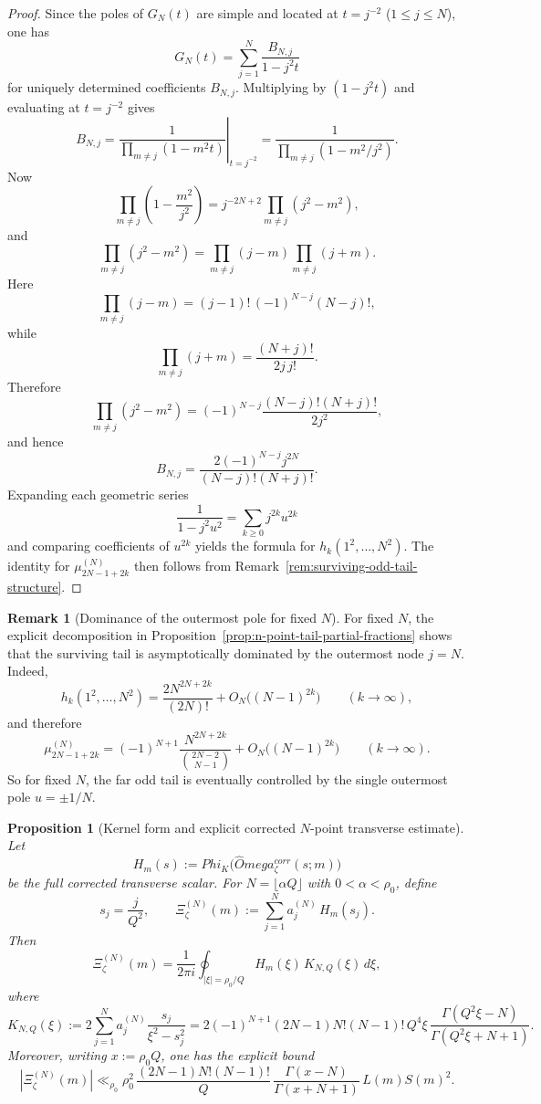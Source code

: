 \documentclass[11pt,a4paper]{amsart}
\def\Omega{Omega}%
\def\Phi{Phi}%
\def\corr{corr}%
\theoremstyle{plain}
\newtheorem{proposition}[theorem]{Proposition}
\theoremstyle{definition}
\newtheorem{remark}[theorem]{Remark}
\newcommand{\corr}{\mathrm{corr}}
\begin{document}
\begin{proof}
Since the poles of $G_N(t)$ are simple and located at $t=j^{-2}$
($1\le j\le N$), one has
\[
G_N(t)=\sum_{j=1}^N \frac{B_{N,j}}{1-j^2 t}
\]
for uniquely determined coefficients $B_{N,j}$. Multiplying by
$(1-j^2 t)$ and evaluating at $t=j^{-2}$ gives
\[
B_{N,j}
=
\left.
\frac{1}{\prod_{m\ne j}(1-m^2 t)}
\right|_{t=j^{-2}}
=
\frac{1}{\prod_{m\ne j}(1-m^2/j^2)}.
\]
Now
\[
\prod_{m\ne j}\left(1-\frac{m^2}{j^2}\right)
=
j^{-2N+2}\prod_{m\ne j}(j^2-m^2),
\]
and
\[
\prod_{m\ne j}(j^2-m^2)
=
\prod_{m\ne j}(j-m)\prod_{m\ne j}(j+m).
\]
Here
\[
\prod_{m\ne j}(j-m)
=
(j-1)! \,(-1)^{N-j}(N-j)!,
\]
while
\[
\prod_{m\ne j}(j+m)
=
\frac{(N+j)!}{2j\,j!}.
\]
Therefore
\[
\prod_{m\ne j}(j^2-m^2)
=
(-1)^{N-j}\frac{(N-j)!(N+j)!}{2j^2},
\]
and hence
\[
B_{N,j}
=
\frac{2(-1)^{N-j}j^{2N}}{(N-j)!(N+j)!}.
\]
Expanding each geometric series
\[
\frac{1}{1-j^2u^2}=\sum_{k\ge 0} j^{2k}u^{2k}
\]
and comparing coefficients of $u^{2k}$ yields the formula for
$h_k(1^2,\dots,N^2)$. The identity for
$\mu_{2N-1+2k}^{(N)}$ then follows from
Remark~\ref{rem:surviving-odd-tail-structure}.
\end{proof}

\begin{remark}[Dominance of the outermost pole for fixed $N$]
\label{rem:n-point-tail-dominant-outer-pole}
For fixed $N$, the explicit decomposition in
Proposition~\ref{prop:n-point-tail-partial-fractions} shows that the surviving
tail is asymptotically dominated by the outermost node $j=N$. Indeed,
\[
h_k(1^2,\dots,N^2)
=
\frac{2N^{2N+2k}}{(2N)!}
+
O_N\!\bigl((N-1)^{2k}\bigr)
\qquad (k\to\infty),
\]
and therefore
\[
\mu_{2N-1+2k}^{(N)}
=
(-1)^{N+1}\frac{N^{2N+2k}}{\binom{2N-2}{N-1}}
+
O_N\!\bigl((N-1)^{2k}\bigr)
\qquad (k\to\infty).
\]
So for fixed $N$, the far odd tail is eventually controlled by the single
outermost pole $u=\pm 1/N$.
\end{remark}

\begin{proposition}[Kernel form and explicit corrected $N$-point transverse estimate]
\label{prop:corrected-n-point}
Let
\[
H_m(s):=\Phi_K\!\bigl(\widehat\Omega_\zeta^{\corr}(s;m)\bigr)
\]
be the full corrected transverse scalar.
For $N=\lfloor \alpha Q\rfloor$ with $0<\alpha<\rho_0$, define
\[
s_j=\frac{j}{Q^2},
\qquad
\Xi_\zeta^{(N)}(m)
:=
\sum_{j=1}^N a_j^{(N)}\,H_m(s_j).
\]
Then
\[
\Xi_\zeta^{(N)}(m)
=
\frac{1}{2\pi i}
\oint_{|\xi|=\rho_0/Q}
H_m(\xi)\,K_{N,Q}(\xi)\,d\xi,
\]
where
\[
K_{N,Q}(\xi)
:=
2\sum_{j=1}^N a_j^{(N)}\frac{s_j}{\xi^2-s_j^2}
=
2(-1)^{N+1}(2N-1)N!(N-1)! \, Q^4\xi\,
\frac{\Gamma(Q^2\xi-N)}{\Gamma(Q^2\xi+N+1)}.
\]
Moreover, writing $x:=\rho_0Q$, one has the explicit bound
\[
|\Xi_\zeta^{(N)}(m)|
\ll_{\rho_0}
\rho_0^2\,
\frac{(2N-1)N!(N-1)!}{Q}\,
\frac{\Gamma(x-N)}{\Gamma(x+N+1)}\,
L(m)S(m)^2.
\]
\end{proposition}
\end{document}
